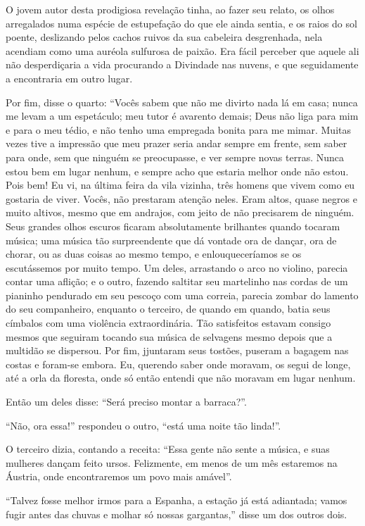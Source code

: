 O jovem autor desta prodigiosa revelação tinha, ao fazer seu relato, os
olhos arregalados numa espécie de estupefação do que ele ainda
sentia, e os raios do sol poente, deslizando pelos cachos ruivos da sua
cabeleira desgrenhada, nela acendiam como uma auréola sulfurosa de
paixão. Era fácil perceber que aquele ali não desperdiçaria a vida
procurando a Divindade nas nuvens, e que seguidamente a encontraria 
em outro lugar.

Por fim, disse o quarto: “Vocês sabem que não me divirto
nada lá em casa; nunca me levam a um espetáculo; meu tutor é avarento
demais; Deus não liga para mim e para o meu tédio, e não tenho uma
empregada bonita para me mimar. Muitas vezes tive a impressão que meu prazer
seria andar sempre em frente, sem saber para onde, sem que ninguém se
preocupasse, e ver sempre novas terras. Nunca estou bem em lugar
nenhum, e sempre acho que estaria melhor onde não estou. Pois bem! Eu
vi, na última feira da vila vizinha, três homens que vivem como eu
gostaria de viver. Vocês, não prestaram atenção neles. Eram
altos, quase negros e muito altivos, mesmo que em andrajos, com jeito
de não precisarem de ninguém. Seus grandes olhos escuros ficaram
absolutamente brilhantes quando tocaram música; uma música tão
surpreendente que dá vontade ora de dançar, ora de chorar, ou as duas
coisas ao mesmo tempo, e enlouqueceríamos se os escutássemos por muito
tempo. Um deles, arrastando o arco no violino, parecia contar uma
aflição; e o outro, fazendo saltitar seu martelinho nas cordas de um
pianinho pendurado em seu pescoço com uma correia, parecia zombar
do lamento do seu companheiro, enquanto o terceiro, de quando
em quando, batia seus címbalos com uma violência extraordinária. Tão
satisfeitos estavam consigo mesmos que seguiram tocando sua música de
selvagens mesmo depois que a multidão se dispersou. Por fim, jjuntaram
seus tostões, puseram a bagagem nas costas e foram-se embora. Eu,
querendo saber onde moravam, os segui de longe, até a orla da
floresta, onde só então entendi que não moravam em lugar nenhum.

Então um deles disse: “Será preciso montar a
barraca?''.

“Não, ora essa!'' respondeu o outro,
“está uma noite tão linda!''.

O terceiro dizia, contando a receita: “Essa gente não
sente a música, e suas mulheres dançam feito ursos. Felizmente, em menos
de um mês estaremos na Áustria, onde encontraremos um povo mais
amável''.

“Talvez fosse melhor irmos para a Espanha, a estação
já está adiantada; vamos fugir antes das chuvas e molhar só nossas
gargantas,'' disse um dos outros dois.



